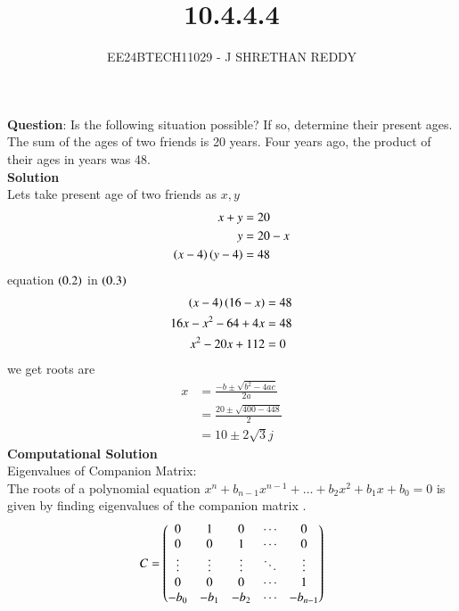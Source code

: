 \documentclass[journal]{IEEEtran}
\begin{document}

\vspace{3cm}

\title{10.4.4.4}
\author{EE24BTECH11029 - J SHRETHAN REDDY}
\maketitle
{\let\newpage\relax\maketitle}

\renewcommand{\thefigure}{\theenumi}
\renewcommand{\thetable}{\theenumi}
\setlength{\intextsep}{10pt} %


\renewcommand{\thetable}{\theenumi}
\textbf{Question}:
Is the following situation possible? If so, determine their present ages.
The sum of the ages of two friends is 20 years. Four years ago, the product of their ages
in years was 48.\\
\textbf{Solution}\\
Lets take present age of two friends as $x,y$\\
\begin{align}
    x + y &= 20\\
    y &= 20 - x\\
    \left(x-4\right)\left(y-4\right) &= 48
\end{align}
equation $\left(0.2\right)$ in $\left(0.3\right)$
\begin{align}
    \left(x-4\right)\left(16-x\right) &= 48\\
    16x-x^2-64+4x &= 48\\
    x^2-20x+112 &= 0
\end{align}
we get roots are
\begin{align}
    x&=\frac{-b\pm \sqrt{b^2-4ac}}{2a}\\
    &=\frac{20\pm \sqrt{400-448}}{2}\\
    &=10\pm 2\sqrt{3}j
\end{align}
\textbf{Computational Solution}\\
Eigenvalues of Companion Matrix:\\
The roots of a polynomial equation $x^n+b_{n-1}x^{n-1}+\dots+b_2x^2+b_1x+b_0 = 0$ is given by finding eigenvalues of the companion matrix .
\begin{align}
	C = \begin{pmatrix}0 & 1 & 0 & \cdots & 0\\ 
	0 & 0 & 1 & \cdots & 0 \\
	\vdots & \vdots & \vdots & \ddots & \vdots\\
	0 & 0 & 0 & \cdots & 1\\
	-b_0 & -b_1 & -b_2 & \cdots & -b_{n-1}\end{pmatrix}
\end{align}
\end{document}
